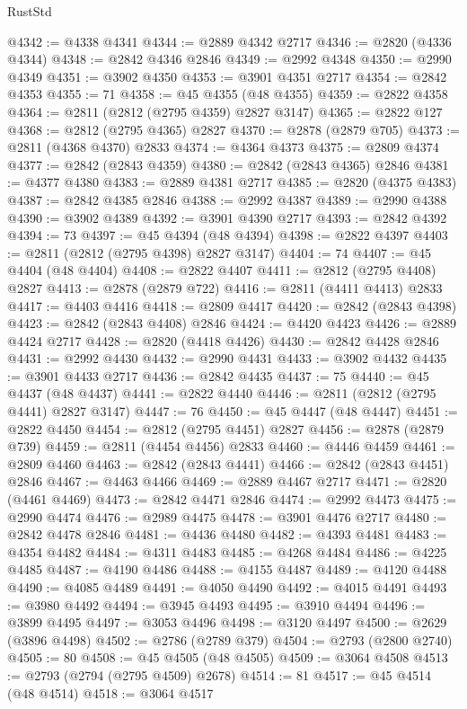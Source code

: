 \begin{lexlean}{RustStd}
\begin{coremodule}
@4342 := @4338 @4341
@4344 := @2889 @4342 @2717
@4346 := @2820 (@4336 @4344)
@4348 := @2842 @4346 @2846
@4349 := @2992 @4348
@4350 := @2990 @4349
@4351 := @3902 @4350
@4353 := @3901 @4351 @2717
@4354 := @2842 @4353
@4355 := 71
@4358 := @45 @4355 (@48 @4355)
@4359 := @2822 @4358
@4364 := @2811 (@2812 (@2795 @4359) @2827 @3147)
@4365 := @2822 @127
@4368 := @2812 (@2795 @4365) @2827
@4370 := @2878 (@2879 @705)
@4373 := @2811 (@4368 @4370) @2833
@4374 := @4364 @4373
@4375 := @2809 @4374
@4377 := @2842 (@2843 @4359)
@4380 := @2842 (@2843 @4365) @2846
@4381 := @4377 @4380
@4383 := @2889 @4381 @2717
@4385 := @2820 (@4375 @4383)
@4387 := @2842 @4385 @2846
@4388 := @2992 @4387
@4389 := @2990 @4388
@4390 := @3902 @4389
@4392 := @3901 @4390 @2717
@4393 := @2842 @4392
@4394 := 73
@4397 := @45 @4394 (@48 @4394)
@4398 := @2822 @4397
@4403 := @2811 (@2812 (@2795 @4398) @2827 @3147)
@4404 := 74
@4407 := @45 @4404 (@48 @4404)
@4408 := @2822 @4407
@4411 := @2812 (@2795 @4408) @2827
@4413 := @2878 (@2879 @722)
@4416 := @2811 (@4411 @4413) @2833
@4417 := @4403 @4416
@4418 := @2809 @4417
@4420 := @2842 (@2843 @4398)
@4423 := @2842 (@2843 @4408) @2846
@4424 := @4420 @4423
@4426 := @2889 @4424 @2717
@4428 := @2820 (@4418 @4426)
@4430 := @2842 @4428 @2846
@4431 := @2992 @4430
@4432 := @2990 @4431
@4433 := @3902 @4432
@4435 := @3901 @4433 @2717
@4436 := @2842 @4435
@4437 := 75
@4440 := @45 @4437 (@48 @4437)
@4441 := @2822 @4440
@4446 := @2811 (@2812 (@2795 @4441) @2827 @3147)
@4447 := 76
@4450 := @45 @4447 (@48 @4447)
@4451 := @2822 @4450
@4454 := @2812 (@2795 @4451) @2827
@4456 := @2878 (@2879 @739)
@4459 := @2811 (@4454 @4456) @2833
@4460 := @4446 @4459
@4461 := @2809 @4460
@4463 := @2842 (@2843 @4441)
@4466 := @2842 (@2843 @4451) @2846
@4467 := @4463 @4466
@4469 := @2889 @4467 @2717
@4471 := @2820 (@4461 @4469)
@4473 := @2842 @4471 @2846
@4474 := @2992 @4473
@4475 := @2990 @4474
@4476 := @2989 @4475
@4478 := @3901 @4476 @2717
@4480 := @2842 @4478 @2846
@4481 := @4436 @4480
@4482 := @4393 @4481
@4483 := @4354 @4482
@4484 := @4311 @4483
@4485 := @4268 @4484
@4486 := @4225 @4485
@4487 := @4190 @4486
@4488 := @4155 @4487
@4489 := @4120 @4488
@4490 := @4085 @4489
@4491 := @4050 @4490
@4492 := @4015 @4491
@4493 := @3980 @4492
@4494 := @3945 @4493
@4495 := @3910 @4494
@4496 := @3899 @4495
@4497 := @3053 @4496
@4498 := @3120 @4497
@4500 := @2629 (@3896 @4498)
@4502 := @2786 (@2789 @379)
@4504 := @2793 (@2800 @2740)
@4505 := 80
@4508 := @45 @4505 (@48 @4505)
@4509 := @3064 @4508
@4513 := @2793 (@2794 (@2795 @4509) @2678)
@4514 := 81
@4517 := @45 @4514 (@48 @4514)
@4518 := @3064 @4517

\end{coremodule}
\end{lexlean}
